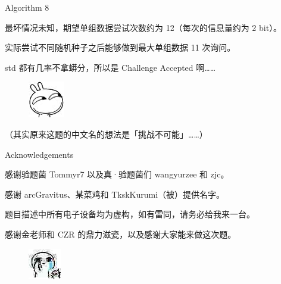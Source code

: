 \documentclass[UTF8]{beamer}
\begin{document}
\begin{frame}{Algorithm 8}

最坏情况未知，期望单组数据尝试次数约为 12（每次的信息量约为 2 bit）。

实际尝试不同随机种子之后能够做到最大单组数据 11 次询问。

\pause
std 都有几率不拿蟒分，所以是 Challenge Accepted 啊……

\begin{figure}[h]\centering
\includegraphics[scale=0.5]{zz.jpg}
\end{figure}

（其实原来这题的中文名的想法是「挑战不可能」……）

\end{frame}

\begin{frame}{Acknowledgements}

感谢验题菌 Tommyr7 以及真·验题菌们 wangyurzee 和 zjc。

感谢 arcGravitus、某菜鸡和 TkskKurumi（被）提供名字。

题目描述中所有电子设备均为虚构，如有雷同，请务必给我来一台。

感谢金老师和 CZR 的鼎力滋瓷，以及感谢大家能来做这次题。

\begin{figure}[h]\centering
\includegraphics[scale=0.015]{ww.jpg}
\end{figure}

\end{frame}
\end{document}
